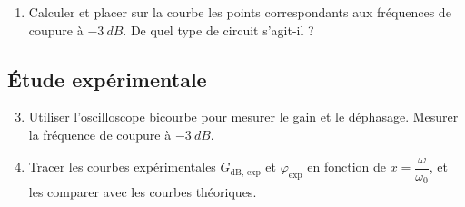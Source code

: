 \documentclass[a4paper,french,bookmarks]{article}
\begin{document}
\begin{enumerate}
        \item Calculer et placer sur la courbe les points correspondants aux fréquences de coupure à $\qty{-3}{dB}$. De quel type de circuit s'agit-il ?
        
    \end{enumerate}
    
    \subsection{Étude expérimentale}
    
    \begin{enumerate}
        \setcounter{enumi}{2}
        \item Utiliser l'oscilloscope bicourbe pour mesurer le gain et le déphasage. Mesurer la fréquence de coupure à $\qty{-3}{dB}$.
        
        \item Tracer les courbes expérimentales $G_\text{dB, exp}$ et $\varphi_\text{exp}$ en fonction de $x = \dfrac{\omega}{\omega_0}$, et les comparer avec les courbes théoriques.
        
\end{enumerate}
\end{document}
